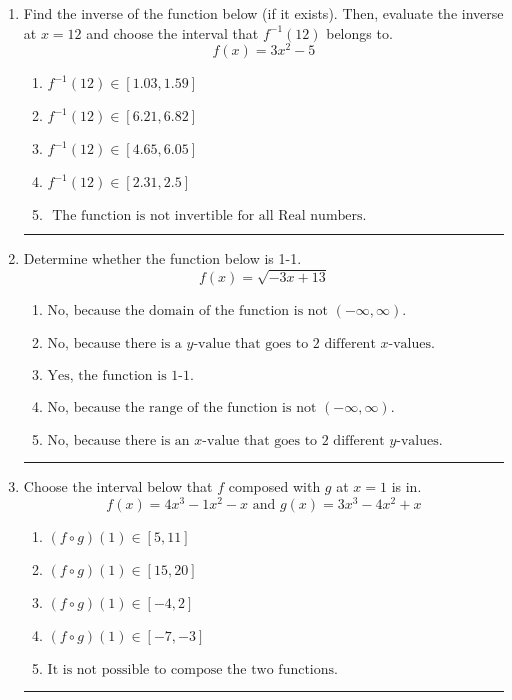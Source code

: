 \documentclass[14pt]{extbook}
\newcommand{\litem}[1]{\item#1\hspace*{-1cm}\rule{\textwidth}{0.4pt}}
\begin{document}
\begin{enumerate}
\litem{
Find the inverse of the function below (if it exists). Then, evaluate the inverse at $x = 12$ and choose the interval that $f^{-1}(12)$ belongs to.\[ f(x) = 3 x^2 - 5 \]\begin{enumerate}[label=\Alph*.]
\item \( f^{-1}(12) \in [1.03, 1.59] \)
\item \( f^{-1}(12) \in [6.21, 6.82] \)
\item \( f^{-1}(12) \in [4.65, 6.05] \)
\item \( f^{-1}(12) \in [2.31, 2.5] \)
\item \( \text{ The function is not invertible for all Real numbers. } \)

\end{enumerate} }
\litem{
Determine whether the function below is 1-1.\[ f(x) = \sqrt{-3 x + 13} \]\begin{enumerate}[label=\Alph*.]
\item \( \text{No, because the domain of the function is not $(-\infty, \infty)$.} \)
\item \( \text{No, because there is a $y$-value that goes to 2 different $x$-values.} \)
\item \( \text{Yes, the function is 1-1.} \)
\item \( \text{No, because the range of the function is not $(-\infty, \infty)$.} \)
\item \( \text{No, because there is an $x$-value that goes to 2 different $y$-values.} \)

\end{enumerate} }
\litem{
Choose the interval below that $f$ composed with $g$ at $x=1$ is in.\[ f(x) = 4x^{3} -1 x^{2} -x \text{ and } g(x) = 3x^{3} -4 x^{2} +x \]\begin{enumerate}[label=\Alph*.]
\item \( (f \circ g)(1) \in [5, 11] \)
\item \( (f \circ g)(1) \in [15, 20] \)
\item \( (f \circ g)(1) \in [-4, 2] \)
\item \( (f \circ g)(1) \in [-7, -3] \)
\item \( \text{It is not possible to compose the two functions.} \)


\end{enumerate}}
\end{enumerate}
\end{document}
